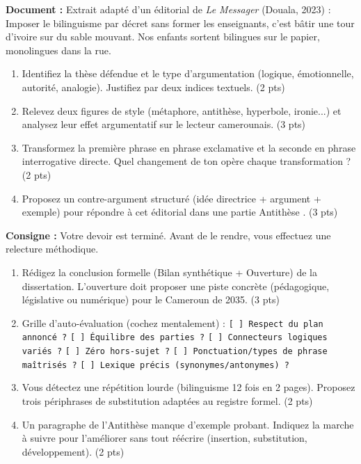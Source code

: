 \documentclass[11pt]{article}
\begin{document}
\begin{exercice}
\textbf{Document :} Extrait adapté d'un éditorial de \textit{Le Messager} (Douala, 2023) : \og Imposer le bilinguisme par décret sans former les enseignants, c'est bâtir une tour d'ivoire sur du sable mouvant. Nos enfants sortent bilingues sur le papier, monolingues dans la rue. \fg{}

\begin{enumerate}
    \item Identifiez la thèse défendue et le type d'argumentation (logique, émotionnelle, autorité, analogie). Justifiez par deux indices textuels. (2 pts)
    \item Relevez deux figures de style (métaphore, antithèse, hyperbole, ironie...) et analysez leur effet argumentatif sur le lecteur camerounais. (3 pts)
    \item Transformez la première phrase en phrase exclamative et la seconde en phrase interrogative directe. Quel changement de ton opère chaque transformation ? (2 pts)
    \item Proposez un contre-argument structuré (idée directrice + argument + exemple) pour répondre à cet éditorial dans une partie \og Antithèse \fg{}. (3 pts)
\end{enumerate}
\end{exercice}

\begin{exercice}
\textbf{Consigne :} Votre devoir est terminé. Avant de le rendre, vous effectuez une relecture méthodique.

\begin{enumerate}
    \item Rédigez la conclusion formelle (Bilan synthétique + Ouverture) de la dissertation. L'ouverture doit proposer une piste concrète (pédagogique, législative ou numérique) pour le Cameroun de 2035. (3 pts)
    \item Grille d'auto-évaluation (cochez mentalement) : \newline
    \texttt{[ ] Respect du plan annoncé ?} \texttt{[ ] Équilibre des parties ?} \newline
    \texttt{[ ] Connecteurs logiques variés ?} \texttt{[ ] Zéro hors-sujet ?} \newline
    \texttt{[ ] Ponctuation/types de phrase maîtrisés ?} \texttt{[ ] Lexique précis (synonymes/antonymes) ?}
    \item Vous détectez une répétition lourde (\og bilinguisme \fg{} 12 fois en 2 pages). Proposez trois périphrases de substitution adaptées au registre formel. (2 pts)
    \item Un paragraphe de l'Antithèse manque d'exemple probant. Indiquez la marche à suivre pour l'améliorer sans tout réécrire (insertion, substitution, développement). (2 pts)
\end{enumerate}
\end{exercice}
\end{document}
